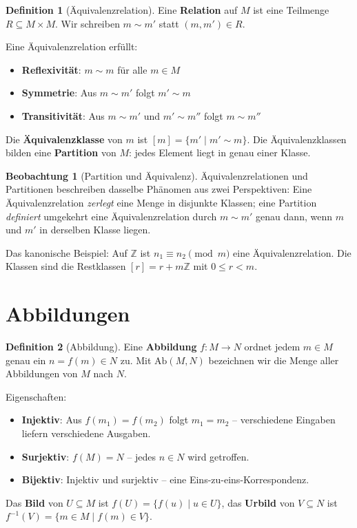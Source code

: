 ﻿\documentclass[a4paper,12pt]{report}
\theoremstyle{definition}
\newtheorem{definition}{Definition}
\newtheorem{beobachtung}{Beobachtung}
\begin{document}
\begin{definition}[Äquivalenzrelation]
    Eine \textbf{Relation} auf $M$ ist eine Teilmenge $R \subseteq M \times M$.
    Wir schreiben $m \sim m'$ statt $(m, m') \in R$.

    Eine Äquivalenzrelation erfüllt:
    \begin{itemize}
        \item[-] \textbf{Reflexivität}: $m \sim m$ für alle $m \in M$
        \item[-] \textbf{Symmetrie}: Aus $m \sim m'$ folgt $m' \sim m$
        \item[-] \textbf{Transitivität}: Aus $m \sim m'$ und $m' \sim m''$ folgt $m \sim m''$
    \end{itemize}

    Die \textbf{Äquivalenzklasse} von $m$ ist $[m] = \{m' \mid m' \sim m\}$.
    Die Äquivalenzklassen bilden eine \textbf{Partition} von $M$: jedes Element
    liegt in genau einer Klasse.
\end{definition}

\begin{beobachtung}[Partition und Äquivalenz]
    Äquivalenzrelationen und Partitionen beschreiben dasselbe Phänomen aus
    zwei Perspektiven: Eine Äquivalenzrelation \emph{zerlegt} eine Menge in
    disjunkte Klassen; eine Partition \emph{definiert} umgekehrt eine
    Äquivalenzrelation durch $m \sim m'$ genau dann, wenn $m$ und $m'$ in
    derselben Klasse liegen.

    Das kanonische Beispiel: Auf $\mathbb{Z}$ ist $n_1 \equiv n_2 \pmod{m}$
    eine Äquivalenzrelation. Die Klassen sind die Restklassen
    $[r] = r + m\mathbb{Z}$ mit $0 \le r < m$.
\end{beobachtung}

\section{Abbildungen}

\begin{definition}[Abbildung]
    Eine \textbf{Abbildung} $f : M \to N$ ordnet jedem $m \in M$ genau ein
    $n = f(m) \in N$ zu. Mit $\mathrm{Ab}(M, N)$ bezeichnen wir die Menge aller
    Abbildungen von $M$ nach $N$.

    Eigenschaften:
    \begin{itemize}
        \item[-] \textbf{Injektiv}: Aus $f(m_1) = f(m_2)$ folgt $m_1 = m_2$ --
              verschiedene Eingaben liefern verschiedene Ausgaben.
        \item[-] \textbf{Surjektiv}: $f(M) = N$ -- jedes $n \in N$ wird getroffen.
        \item[-] \textbf{Bijektiv}: Injektiv und surjektiv -- eine
              Eins-zu-eins-Korrespondenz.
    \end{itemize}
    Das \textbf{Bild} von $U \subseteq M$ ist $f(U) = \{f(u) \mid u \in U\}$,
    das \textbf{Urbild} von $V \subseteq N$ ist
    $f^{-1}(V) = \{m \in M \mid f(m) \in V\}$.
\end{definition}
\end{document}
